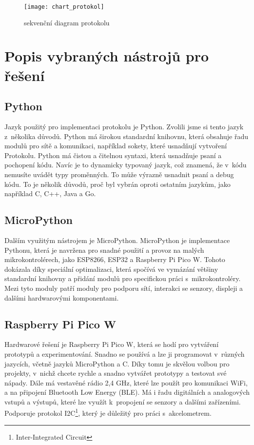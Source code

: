 \documentclass[12pt]{report}			%
\begin{document}
\begin{figure}[h]
\caption{sekvenční diagram protokolu}
\centering
 \texttt{[image: chart\_protokol]}
\end{figure}

\section{Popis vybraných  nástrojů pro řešení}

\subsection{Python}

Jazyk použitý pro implementaci protokolu je Python. Zvolili jsme si tento jazyk z~několika důvodů. 
Python má širokou standardní knihovnu, která obsahuje řadu modulů pro sítě a komunikaci, například sokety, které usnadňují vytvoření Protokolu.
Python má čistou a čitelnou syntaxi, která usnadňuje psaní a pochopení kódu. Navíc je to dynamicky typovaný jazyk, což znamená, že v~kódu nemusíte uvádět typy proměnných. To může výrazně usnadnit psaní a debug kódu.
To je několik důvodů, proč byl vybrán oproti ostatním jazykům, jako například C, C++, Java a Go.\cite{python}

\subsection{MicroPython}

Dalším využitým nástrojem je MicroPython. MicroPython je implementace Pythonu, která je navržena pro snadné použití a provoz na malých mikrokontrolérech, jako ESP8266, ESP32 a Raspberry Pi Pico W. Tohoto dokázala díky speciální optimalizaci, která spočívá ve vymázání většiny standardní knihovny a přidání modulů pro specifickou práci s~mikrokontroléry. Mezi tyto moduly patří moduly pro podporu sítí, interakci se senzory, displeji a dalšími hardwarovými komponentami.\cite{micropython}

\subsection{Raspberry Pi Pico W }

Hardwarové řešení je Raspberry Pi Pico W, která se hodí pro vytváření prototypů a experimentování. Snadno se používá a lze ji programovat v~různých jazycích, včetně jazyků MicroPython a C. Díky tomu je skvělou volbou pro projekty, v~nichž chcete rychle a snadno vytvářet prototypy a testovat své nápady. Dále má vestavěné rádio 2,4 GHz, které lze použít pro komunikaci WiFi, a na připojení Bluetooth Low Energy (BLE). Má i řadu digitálních a analogových vstupů a výstupů, které lze využít k~propojení se senzory a dalšími zařízeními. Podporuje protokol I2C\footnote{Inter-Integrated Circuit}, který je důležitý pro práci s~akcelometrem.  \cite{raspberry}
\end{document}
